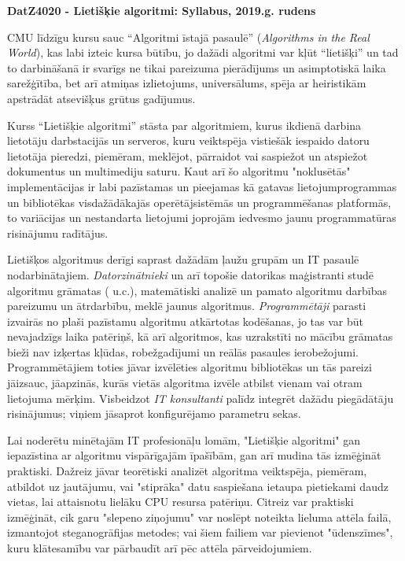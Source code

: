 \documentclass[11pt]{article}
\begin{document}
\thispagestyle{empty}

{\Large \bf DatZ4020 - Lietišķie algoritmi: Syllabus, 2019.g. rudens}

CMU līdzīgu kursu sauc ``Algoritmi īstajā 
pasaulē'' ({\em Algorithms in the Real World}), kas labi izteic kursa
būtību, jo dažādi algoritmi var kļūt ``lietišķi'' un tad to darbināšanā
ir svarīgs ne tikai pareizuma pierādījums un asimptotiskā laika sarežģītība, 
bet arī atmiņas izlietojums, universālums, spēja ar heiristikām apstrādāt
atsevišķus grūtus gadījumus.

Kurss ``Lietišķie algoritmi'' stāsta par algoritmiem, kurus ikdienā darbina 
lietotāju darbstacijās un serveros, kuru veiktspēja vistiešāk iespaido datoru 
lietotāja pieredzi, piemēram, meklējot, pārraidot vai saspiežot un atspiežot 
dokumentus un multimediju saturu. Kaut arī šo algoritmu "noklusētās" implementācijas
ir labi pazīstamas un pieejamas kā gatavas lietojumprogrammas un bibliotēkas
visdažādākajās operētājsistēmās un programmēšanas platformās, to variācijas 
un nestandarta lietojumi
joprojām iedvesmo jaunu programmatūras risinājumu radītājus. 

Lietišķos algoritmus derīgi saprast dažādām ļaužu grupām un IT pasaulē nodarbinātajiem. 
{\em Datorzinātnieki} un arī topošie datorikas maģistranti studē algoritmu grāmatas
(\cite{CLR} u.c.), matemātiski analizē un pamato algoritmu darbības pareizumu un ātrdarbību, 
meklē jaunus algoritmus. {\em Programmētāji} parasti izvairās no plaši pazīstamu algoritmu 
atkārtotas kodēšanas, jo tas var būt nevajadzīgs laika patēriņš, kā arī algoritmos, kas uzrakstīti
no mācību grāmatas bieži nav izķertas kļūdas, robežgadījumi un reālās pasaules ierobežojumi. 
Programmētājiem toties jāvar izvēlēties algoritmu bibliotēkas un tās pareizi jāizsauc, 
jāapzinās, kurās vietās algoritma izvēle atbilst vienam vai otram lietojuma mērķim.
Visbeidzot {\em IT konsultanti} palīdz integrēt dažādu piegādātāju risinājumus; viņiem 
jāsaprot konfigurējamo parametru sekas. 

Lai noderētu minētajām IT profesionāļu lomām, "Lietišķie algoritmi" gan iepazīstina ar algoritmu 
vispārīgajām īpašībām, gan arī mudina tās izmēģināt praktiski. Dažreiz jāvar teorētiski analizēt
algoritma veiktspēja, piemēram, atbildot uz jautājumu, vai "stiprāka" datu saspiešana 
ietaupa pietiekami daudz vietas, lai attaisnotu lielāku CPU resursa patēriņu. 
Citreiz var praktiski izmēģināt, cik garu "slepeno ziņojumu" var noslēpt noteikta lieluma 
attēla failā, izmantojot steganogrāfijas metodes; vai šiem failiem var pievienot
"ūdenszīmes", kuru klātesamību var pārbaudīt arī pēc attēla pārveidojumiem.
\end{document}
